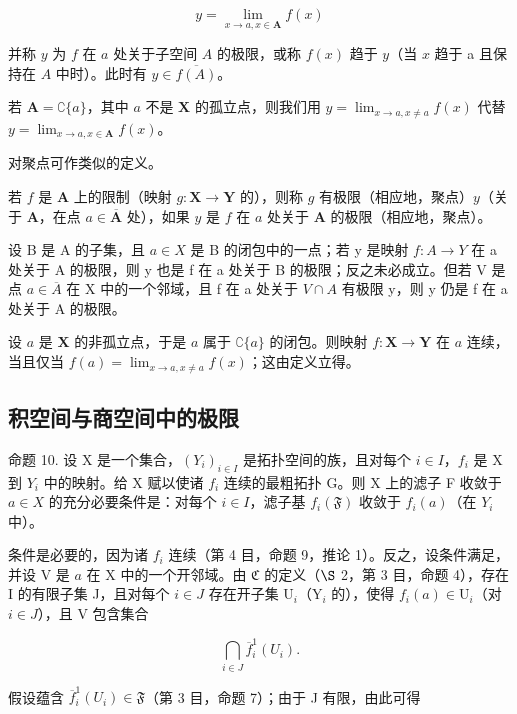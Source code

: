 \[
y = \lim _ {x \to a, x \in \mathbf {A}} f (x)
\]

并称 \(y\) 为 \(f\) 在 \(a\) 处关于子空间 \(A\) 的极限，或称 \(f(x)\) 趋于 \(y\)（当 \(x\) 趋于 a 且保持在 \(A\) 中时）。此时有 \(y \in \overline{f(A)}\)。

若 \(\mathbf{A} = \complement\{a\}\)，其中 \(a\) 不是 \(\mathbf{X}\) 的孤立点，则我们用 \(y = \lim_{x\to a,x\neq a}f(x)\) 代替 \(y = \lim_{x\to a,x\in \mathbf{A}}f(x)\)。

对聚点可作类似的定义。

若 \(f\) 是 \(\mathbf{A}\) 上的限制（映射 \(g: \mathbf{X} \to \mathbf{Y}\) 的），则称 \(g\) 有极限（相应地，聚点）\(y\)（关于 \(\mathbf{A}\)，在点 \(a \in \overline{\mathbf{A}}\) 处），如果 \(y\) 是 \(f\) 在 \(a\) 处关于 \(\mathbf{A}\) 的极限（相应地，聚点）。

设 B 是 A 的子集，且 \(a \in X\) 是 B 的闭包中的一点；若 y 是映射 \(f: A \to Y\) 在 a 处关于 A 的极限，则 y 也是 f 在 a 处关于 B 的极限；反之未必成立。但若 V 是点 \(a \in \overline{A}\) 在 X 中的一个邻域，且 f 在 a 处关于 \(V \cap A\) 有极限 y，则 y 仍是 f 在 a 处关于 A 的极限。

设 \(a\) 是 \(\mathbf{X}\) 的非孤立点，于是 \(a\) 属于 \(\complement\{a\}\) 的闭包。则映射 \(f: \mathbf{X} \to \mathbf{Y}\) 在 \(a\) 连续，当且仅当 \(f(a) = \lim_{x \to a, x \neq a} f(x)\)；这由定义立得。

\subsection{积空间与商空间中的极限}

命题 10. 设 X 是一个集合，\((Y_{i})_{i\in I}\) 是拓扑空间的族，且对每个 \(i\in I\)，\(f_{i}\) 是 X 到 \(Y_{i}\) 中的映射。给 X 赋以使诸 \(f_{i}\) 连续的最粗拓扑 G。则 X 上的滤子 F 收敛于 \(a\in X\) 的充分必要条件是：对每个 \(i\in I\)，滤子基 \(f_{i}(\mathfrak{F})\) 收敛于 \(f_{i}(a)\)（在 \(Y_{i}\) 中）。

条件是必要的，因为诸 \(f_{i}\) 连续（第 4 目，命题 9，推论 1）。反之，设条件满足，并设 V 是 \(a\) 在 X 中的一个开邻域。由 \(\mathfrak{C}\) 的定义（\(\S\) 2，第 3 目，命题 4），存在 I 的有限子集 J，且对每个 \(i\in J\) 存在开子集 \(\mathrm{U}_{i}\)（\(\mathrm{Y}_{i}\) 的），使得 \(f_{i}(a)\in\mathrm{U}_{i}\)（对 \(i\in J\)），且 V 包含集合

\[
\bigcap_ {i \in J} \overline {{f}} _ {i} ^ {1} (U _ {i}).
\]

假设蕴含 \(\overline{f}_{i}^{1}(U_{i})\in\mathfrak{F}\)（第 3 目，命题 7）；由于 J 有限，由此可得

